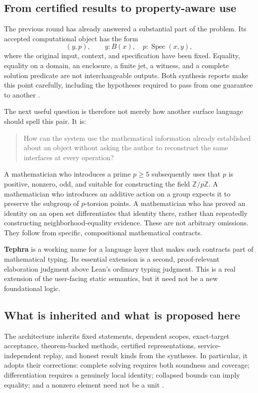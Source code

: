 \documentclass[11pt,a4paper]{article}
\newcommand{\Z}{\mathbb Z}
\newcommand{\Spec}{\operatorname{Spec}}
\theoremstyle{plain}
\theoremstyle{definition}
\begin{document}
\subsection{From certified results to property-aware use}
The previous round has already answered a substantial part of the problem. Its accepted computational object has the form
\[
  (y,p),\qquad y:B(x),\quad p:\Spec(x,y),
\]
where the original input, context, and specification have been fixed. Equality, equality on a domain, an enclosure, a finite jet, a witness, and a complete solution predicate are not interchangeable outputs. Both synthesis reports make this point carefully, including the hypotheses required to pass from one guarantee to another \cite{synA,synB}.

The next useful question is therefore not merely how another surface language should spell this pair. It is:
\begin{quote}
How can the system use the mathematical information already established about an object without asking the author to reconstruct the same interfaces at every operation?
\end{quote}
A mathematician who introduces a prime $p\ge5$ subsequently uses that $p$ is positive, nonzero, odd, and suitable for constructing the field $\Z/p\Z$. A mathematician who introduces an additive action on a group expects it to preserve the subgroup of $p$-torsion points. A mathematician who has proved an identity on an open set differentiates that identity there, rather than repeatedly constructing neighborhood-equality evidence. These are not arbitrary omissions. They follow from specific, compositional mathematical contracts.

\textbf{Tephra} is a working name for a language layer that makes such contracts part of mathematical typing. Its essential extension is a second, proof-relevant elaboration judgment above Lean's ordinary typing judgment. This is a real extension of the user-facing static semantics, but it need not be a new foundational logic.

\subsection{What is inherited and what is proposed here}
The architecture inherits fixed statements, dependent scopes, exact-target acceptance, theorem-backed methods, certified representations, service-independent replay, and honest result kinds from the syntheses. In particular, it adopts their corrections: complete solving requires both soundness and coverage; differentiation requires a genuinely local identity; collapsed bounds can imply equality; and a nonzero element need not be a unit \cite{synA,synB}.
\end{document}
